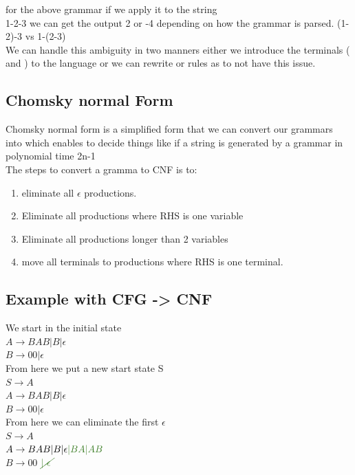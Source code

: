 \documentclass[a4paper,10pt,titlepage]{report}
\begin{document}
for the above grammar if we apply it to the string\\
1-2-3 we can get the output 2 or -4 depending on how the grammar is parsed. (1-2)-3 vs 1-(2-3)\\
We can handle this ambiguity in two manners either we introduce the terminals ( and ) to the language or we can rewrite or rules as to not have this issue.\\

\subsection{Chomsky normal Form}
Chomsky normal form is a simplified form that we can convert our grammars into which enables to decide things like if a string is generated by a grammar in polynomial time 2n-1\\

The steps to convert a gramma to CNF is to:\\
\begin{enumerate}
\item eliminate all $\epsilon$ productions.
\item Eliminate all productions where RHS is one variable
\item Eliminate all productions longer than 2 variables
\item move all terminals to productions where RHS is one terminal.
\end{enumerate}
\subsection{Example with CFG -> CNF}

We start in the initial state \\
$ A \rightarrow BAB | B | \epsilon $\\
$ B \rightarrow 00 | \epsilon $ \\
\vspace{5mm}
From here we put a new start state S\\
\vspace{5mm}
$ S \rightarrow A$\\
$ A \rightarrow BAB | B | \epsilon $\\
$ B \rightarrow 00 | \epsilon $\\
\vspace{5mm}
From here we can eliminate the first $\epsilon$ \\
\vspace{5mm}
$ S \rightarrow A$\\
$ A \rightarrow BAB | B | \epsilon \textcolor{OliveGreen}{|BA|AB}$\\
$ B \rightarrow 00 $ $\textcolor{OliveGreen}{\cancel{ | \ \epsilon \ }}$\\
\end{document}
